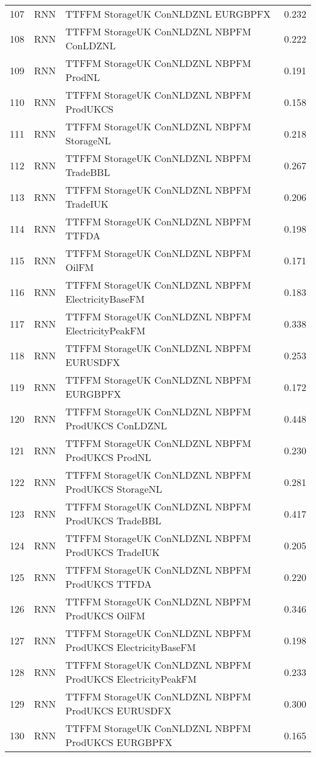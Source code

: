 \begin{table}[ht]
\begin{tabular}{rllr}
  107 & RNN & TTFFM StorageUK ConNLDZNL EURGBPFX & 0.232 \\ 
  108 & RNN & TTFFM StorageUK ConNLDZNL NBPFM ConLDZNL & 0.222 \\ 
  109 & RNN & TTFFM StorageUK ConNLDZNL NBPFM ProdNL & 0.191 \\ 
  110 & RNN & TTFFM StorageUK ConNLDZNL NBPFM ProdUKCS & 0.158 \\ 
  111 & RNN & TTFFM StorageUK ConNLDZNL NBPFM StorageNL & 0.218 \\ 
  112 & RNN & TTFFM StorageUK ConNLDZNL NBPFM TradeBBL & 0.267 \\ 
  113 & RNN & TTFFM StorageUK ConNLDZNL NBPFM TradeIUK & 0.206 \\ 
  114 & RNN & TTFFM StorageUK ConNLDZNL NBPFM TTFDA & 0.198 \\ 
  115 & RNN & TTFFM StorageUK ConNLDZNL NBPFM OilFM & 0.171 \\ 
  116 & RNN & TTFFM StorageUK ConNLDZNL NBPFM ElectricityBaseFM & 0.183 \\ 
  117 & RNN & TTFFM StorageUK ConNLDZNL NBPFM ElectricityPeakFM & 0.338 \\ 
  118 & RNN & TTFFM StorageUK ConNLDZNL NBPFM EURUSDFX & 0.253 \\ 
  119 & RNN & TTFFM StorageUK ConNLDZNL NBPFM EURGBPFX & 0.172 \\ 
  120 & RNN & TTFFM StorageUK ConNLDZNL NBPFM ProdUKCS ConLDZNL & 0.448 \\ 
  121 & RNN & TTFFM StorageUK ConNLDZNL NBPFM ProdUKCS ProdNL & 0.230 \\ 
  122 & RNN & TTFFM StorageUK ConNLDZNL NBPFM ProdUKCS StorageNL & 0.281 \\ 
  123 & RNN & TTFFM StorageUK ConNLDZNL NBPFM ProdUKCS TradeBBL & 0.417 \\ 
  124 & RNN & TTFFM StorageUK ConNLDZNL NBPFM ProdUKCS TradeIUK & 0.205 \\ 
  125 & RNN & TTFFM StorageUK ConNLDZNL NBPFM ProdUKCS TTFDA & 0.220 \\ 
  126 & RNN & TTFFM StorageUK ConNLDZNL NBPFM ProdUKCS OilFM & 0.346 \\ 
  127 & RNN & TTFFM StorageUK ConNLDZNL NBPFM ProdUKCS ElectricityBaseFM & 0.198 \\ 
  128 & RNN & TTFFM StorageUK ConNLDZNL NBPFM ProdUKCS ElectricityPeakFM & 0.233 \\ 
  129 & RNN & TTFFM StorageUK ConNLDZNL NBPFM ProdUKCS EURUSDFX & 0.300 \\ 
  130 & RNN & TTFFM StorageUK ConNLDZNL NBPFM ProdUKCS EURGBPFX & 0.165 \\ 

\end{tabular}
\end{table}
